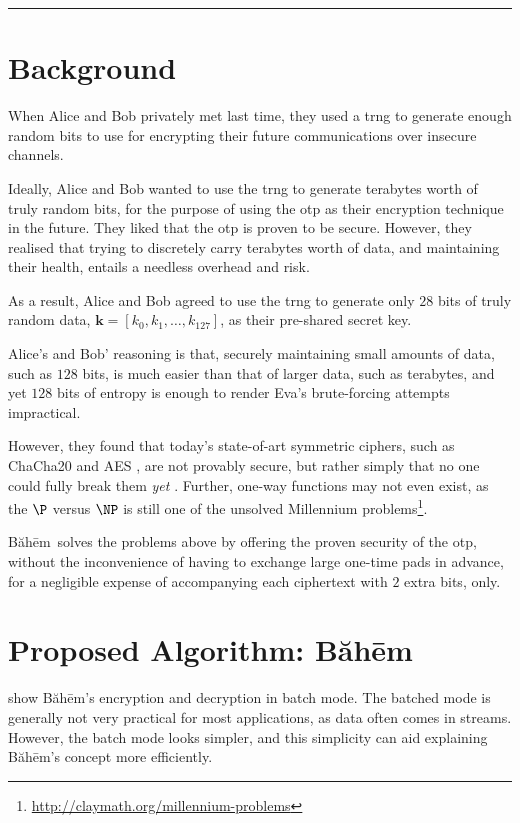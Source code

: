 \documentclass[twocolumn,hidelinks]{article}
\newcommand{\baheem}{Băhēm}
\begin{document}
\tableofcontents
\vfill
\hrule
\footnotesize
\doclicenseThis
\normalsize

\section{Background}
When Alice and Bob privately met last time, they used a \gls{trng} to generate
enough random bits to use for encrypting their future communications over
insecure channels.

Ideally, Alice and Bob wanted to use the \gls{trng} to generate terabytes
worth of truly random bits, for the purpose of using the \gls{otp} as their
encryption technique in the future.  They liked that the \gls{otp} is
proven to be secure.  However, they realised that trying to discretely
carry terabytes worth of data, and maintaining their health, entails a
needless overhead and risk.

As a result, Alice and Bob agreed to use the \gls{trng} to generate only
$28$ bits of truly random data, $\mathbf{k} = [k_0, k_1, \ldots, k_{127}]$,
as their pre-shared secret key.

Alice's and Bob' reasoning is that, securely maintaining small amounts of
data, such as $128$ bits, is much easier than that of larger data, such as
terabytes, and yet $128$ bits of entropy is enough to render Eva's
brute-forcing attempts impractical.

However, they found that today's state-of-art symmetric ciphers, such as
ChaCha20 \cite{chacha20} and AES \cite{aes}, are not provably secure, but
rather simply that no one could fully break them \emph{yet}
\cite{cryptoeprint:2007:472}. Further, one-way functions may not even
exist, as the $\P$ versus $\NP$ is still one of the unsolved Millennium
problems\footnote{\url{http://claymath.org/millennium-problems}}.

\baheem\ solves the problems above by offering the proven security of the
\gls{otp}, without the inconvenience of having to exchange large one-time
pads in advance, for a negligible expense of accompanying each ciphertext
with $2$ extra bits, only.

\section{Proposed Algorithm:  \baheem}
 show \baheem's encryption and
decryption in batch mode.  The batched mode is generally not very practical
for most applications, as data often comes in streams. However, the batch
mode looks simpler, and this simplicity can aid explaining \baheem's
concept more efficiently.
\end{document}

